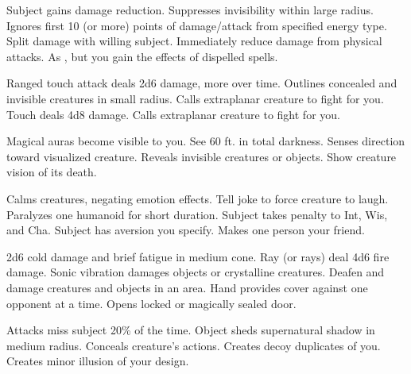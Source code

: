 \begin{swspelllist}
   Subject gains damage reduction.
   Suppresses invisibility within large radius.
   Ignores first 10 (or more) points of damage/attack from specified energy type.
   Split damage with willing subject.
   Immediately reduce damage from physical attacks.
   As , but you gain the effects of dispelled spells.

   Ranged touch attack deals 2d6 damage, more over time.
   Outlines concealed and invisible creatures in small radius.
   Calls extraplanar creature to fight for you.
   Touch deals 4d8 damage.
   Calls extraplanar creature to fight for you.

   Magical auras become visible to you.
   See 60 ft. in total darkness.
   Senses direction toward visualized creature.
   Reveals invisible creatures or objects.
   Show creature vision of its death.
  \spellheadrestricted{}

   Calms creatures, negating emotion effects.
   Tell joke to force creature to laugh. 
   Paralyzes one humanoid for short duration.
   Subject takes  penalty to Int, Wis, and Cha.
   Subject has aversion you specify.
   Makes one person your friend.

   2d6 cold damage and brief fatigue in medium cone.
   Ray (or rays) deal 4d6 fire damage.
   Sonic vibration damages objects or crystalline creatures.
   Deafen and damage creatures and objects in an area. 
   Hand provides cover against one opponent at a time.
   Opens locked or magically sealed door.

   Attacks miss subject 20\% of the time.
   Object sheds supernatural shadow in medium radius.
   Conceals creature's actions. 
   Creates decoy duplicates of you.
   Creates minor illusion of your design.


\end{swspelllist}
